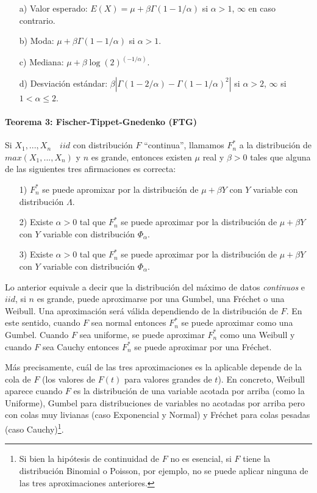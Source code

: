 \documentclass[
]{book}
\theoremstyle{definition}
\theoremstyle{definition}
\theoremstyle{definition}
\theoremstyle{definition}
\theoremstyle{remark}
\begin{document}
\begin{itemize}
  \item[a)] Valor esperado: $E(X) = \mu + \beta\Gamma(1-1/\alpha)$ si $\alpha > 1$, $\infty$ en caso contrario.
  \item[b)] Moda: $\mu + \beta\Gamma(1-1/\alpha)$ si $\alpha>1$.
  \item[c)] Mediana: $\mu + \beta \log(2)^{(-1/\alpha)}$.
  \item[d)] Desviación estándar: $\beta|\Gamma(1-2/\alpha)-\Gamma(1-1/\alpha)^2|$ si $\alpha>2$, $\infty$ si $1<\alpha \leq 2$.
\end{itemize}

\newpage

\paragraph{Teorema 3: Fischer-Tippet-Gnedenko (FTG)}\label{teorema-3-fischer-tippet-gnedenko-ftg}

Si \(X_1,...,X_n\quad iid\) con distribución \(F\) ``continua'', llamamos \(F_n^*\) a la distribución de \(max(X_1,...,X_n)\) y \(n\) es grande, entonces existen \(\mu\) real y \(\beta>0\) tales que alguna de las siguientes tres afirmaciones es correcta:

\begin{itemize}
  \item[1)] $F_n^*$ se puede apromixar por la distribución de $\mu+\beta Y$ con $Y$ variable con distribución $\Lambda$.
  \item[2)] Existe $\alpha>0$ tal que $F_n^*$ se puede aproximar por la distribución de $\mu+\beta Y$ con $Y$ variable con distribución $\Phi_{\alpha}$. 
  \item[3)] Existe $\alpha>0$ tal que $F_n^*$ se puede aproximar por la distribución de $\mu+\beta Y$ con $Y$ variable con distribución $\Phi_{\alpha}$.
\end{itemize}

Lo anterior equivale a decir que la distribución del máximo de datos \textit{continuos} e \(iid\), si \(n\) es grande, puede aproximarse por una Gumbel, una Fréchet o una Weibull. Una aproximación será válida dependiendo de la distribución de \(F\). En este sentido, cuando \(F\) sea normal entonces \(F_n^*\) se puede aproximar como una Gumbel. Cuando \(F\) sea uniforme, se puede aproximar \(F_n^*\) como una Weibull y cuando \(F\) sea Cauchy entonces \(F_n^*\) se puede aproximar por una Fréchet.

Más precisamente, cuál de las tres aproximaciones es la aplicable depende de la cola de \(F\) (los valores de \(F(t)\) para valores grandes de \(t\)).
En concreto, Weibull aparece cuando \(F\) es la distribución de una variable acotada por arriba (como la Uniforme), Gumbel para distribuciones de variables no acotadas por arriba pero con colas muy livianas (caso Exponencial y Normal) y Fréchet para colas pesadas (caso Cauchy)\footnote{Si bien  la hipótesis de continuidad de $F$ no es esencial, si $F$ tiene
la distribución Binomial o Poisson, por ejemplo, no se puede aplicar ninguna de las tres aproximaciones anteriores.}.
\end{document}
